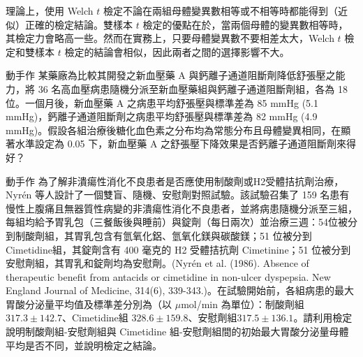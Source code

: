     \medskip
    
    理論上，使用 Welch $t$ 檢定不論在兩組母體變異數相等或不相等時都能得到（近似）正確的檢定結論。雙樣本 $t$ 檢定的優點在於，當兩個母體的變異數相等時，其檢定力會略高一些。然而在實務上，只要母體變異數不要相差太大，Welch $t$ 檢定和雙樣本 $t$ 檢定的結論會相似，因此兩者之間的選擇影響不大。

    \bigskip

    \begin{custom}{動手作}
       某藥廠為比較其開發之新血壓藥 A 與鈣離子通道阻斷劑降低舒張壓之能力，將 36 名高血壓病患隨機分派至新血壓藥組與鈣離子通道阻斷劑組，各為 18 位。一個月後，新血壓藥 A 之病患平均舒張壓與標準差為 85 mmHg (5.1 mmHg)，鈣離子通道阻斷劑之病患平均舒張壓與標準差為 82 mmHg (4.9 mmHg)。假設各組治療後糖化血色素之分布均為常態分布且母體變異相同，在顯著水準設定為 0.05 下，新血壓藥 A 之舒張壓下降效果是否鈣離子通道阻斷劑來得好？
    \end{custom}

    \answerbox{150pt}
    
    \bigskip

    \begin{custom}{動手作}
       為了解非潰瘍性消化不良患者是否應使用制酸劑或H2受體拮抗劑治療，Nyrén 等人設計了一個雙盲、隨機、安慰劑對照試驗。該試驗召集了 159 名患有慢性上腹痛且無器質性病變的非潰瘍性消化不良患者，並將病患隨機分派至三組，每組均給予胃乳包（三餐飯後與睡前）與錠劑（每日兩次）並治療三週：54位被分到制酸劑組，其胃乳包含有氫氧化鋁、氫氧化鎂與碳酸鎂；51 位被分到 Cimetidine組，其錠劑含有 400 毫克的 H2 受體拮抗劑 Cimetinine；51 位被分到安慰劑組，其胃乳和錠劑均為安慰劑。(Nyrén et al. (1986). Absence of therapeutic benefit from antacids or cimetidine in non-ulcer dyspepsia. New England Journal of Medicine, 314(6), 339-343.)。在試驗開始前，各組病患的最大胃酸分泌量平均值及標準差分別為（以 $\mu$mol/min 為單位）：制酸劑組$317.3 \pm 142.7$、Cimetidine組 $328.6 \pm 159.8$、安慰劑組$317.5 \pm 136.1$。請利用檢定說明制酸劑組-安慰劑組與 Cimetidine 組-安慰劑組間的初始最大胃酸分泌量母體平均是否不同，並說明檢定之結論。
    \end{custom}

    \answerbox{480pt}

    \bigskip

